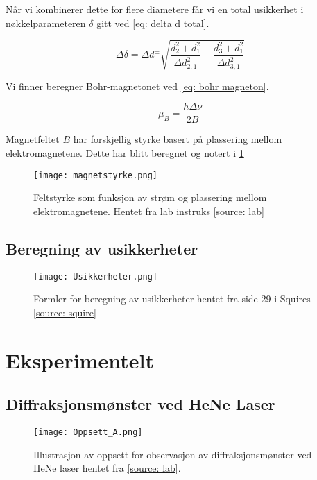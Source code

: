 \documentclass[reprint,norsk,notitlepage,floatfix]{revtex4-2}
\begin{document}
      Når vi kombinerer dette for flere diametere får vi en total usikkerhet i nøkkelparameteren $δ$ gitt ved \cref{eq: delta d total}.
      
      \begin{equation}\label{eq: delta d total}
        Δδ = Δd^{±}\sqrt{\frac{d_2^2 + d_1^2}{\Delta d_{2,1}^2} + \frac{d_3^2 + d_1^2}{\Delta d_{3,1}^2}} 
      \end{equation}
    
      Vi finner beregner Bohr-magnetonet ved \cref{eq: bohr magneton}.
      
      \begin{equation}\label{eq: bohr magneton}
        μ_B = \frac{hΔν}{2B}
      \end{equation}
      
      
      Magnetfeltet $B$ har forskjellig styrke basert på plassering mellom elektromagnetene. Dette har blitt beregnet og notert i \ref{fig: feltstyrke}
      
      \begin{figure}[h!]
        \centering
        \texttt{[image: magnetstyrke.png]}
        \caption{Feltstyrke som funksjon av strøm og plassering mellom elektromagnetene. Hentet fra lab instruks \ref{source: lab}}
        \label{fig: feltstyrke}
      \end{figure}
  
    \subsection{Beregning av usikkerheter}
      \begin{figure}[h!]
        \centering
        \texttt{[image: Usikkerheter.png]}
        \caption{Formler for beregning av usikkerheter hentet fra side 29 i Squires \ref{source: squire}}
        \label{fig: usikkerheter}
      \end{figure}
    
    



\section{Eksperimentelt} \label{sec: eksperimentelt}
  \subsection{Diffraksjonsmønster ved HeNe Laser}
    \begin{figure}[h!]
      \centering
      \texttt{[image: Oppsett\_A.png]}
      \caption{Illustrasjon av oppsett for observasjon av diffraksjonsmønster ved HeNe laser hentet fra \ref{source: lab}.}
      \label{fig: oppsett_A}
    \end{figure}
\end{document}
